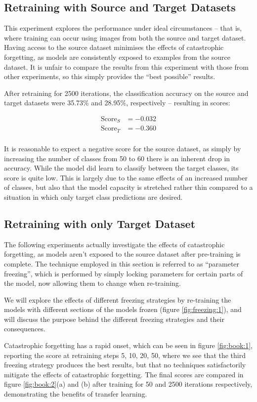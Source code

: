 \documentclass{report}
\newcommand{\SCORE}[2]{
	\begin{align*}
	\text{Score}_S &= #1 \\
	\text{Score}_T &= #2 \\
	\end{align*}
}
\begin{document}
	\subsection{Retraining with Source and Target Datasets}
	This experiment explores the performance under ideal circumstances -- that is, where training can occur using images from both the source and target dataset. Having access to the source dataset minimises the effects of catastrophic forgetting, as models are consistently exposed to examples from the source dataset. It is unfair to compare the results from this experiment with those from other experiments, so this simply provides the ``best possible'' results. \par
	After retraining for 2500 iterations, the classification accuracy on the source and target datasets were 35.73\% and 28.95\%, respectively -- resulting in scores:
	\SCORE{-0.032}{-0.360}	
	It is reasonable to expect a negative score for the source dataset, as simply by increasing the number of classes from 50 to 60 there is an inherent drop in accuracy. While the model did learn to classify between the target classes, its score is quite low. This is largely due to the same effects of an increased number of classes, but also that the model capacity is stretched rather thin compared to a situation in which only target class predictions are desired. \par

	\subsection{Retraining with only Target Dataset}
	The following experiments actually investigate the effects of catastrophic forgetting, as models aren't exposed to the source dataset after pre-training is complete. The technique employed in this section is referred to as ``parameter freezing'', which is performed by simply locking parameters for certain parts of the model, now allowing them to change when re-training. \par 
	We will explore the effects of different freezing strategies by re-training the models with different sections of the models frozen (figure \ref{fig:freezing:1}), and will discuss the purpose behind the different freezing strategies and their consequences. \par
	Catastrophic forgetting has a rapid onset, which can be seen in figure \ref{fig:book:1}, reporting the score at retraining steps 5, 10, 20, 50, where we see that the third freezing strategy produces the best results, but that no techniques satisfactorily mitigate the effects of catastrophic forgetting. The final scores are compared in figure \ref{fig:book:2}(a) and (b) after training for 50 and 2500 iterations respectively, demonstrating the benefits of transfer learning. \par
	
\end{document}
